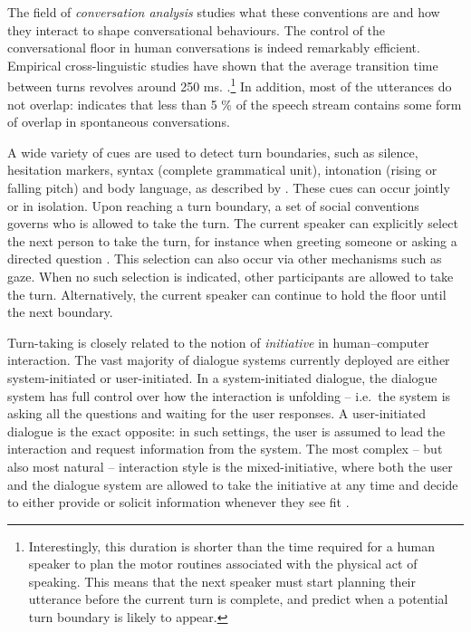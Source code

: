 The field of  \textit{conversation analysis} studies what these conventions are and how they interact to shape conversational behaviours. The control of the conversational floor in human conversations is indeed remarkably efficient.  Empirical cross-linguistic studies have shown that the average transition time between turns revolves around 250 ms. \citep{Stivers30062009}.\footnote{Interestingly, this duration is shorter than the time required for a human speaker to plan the motor routines associated with the physical act of speaking.  This means that the next speaker must start planning their utterance before the current turn is complete, and predict when a potential turn boundary is likely to appear.} In addition, most of the utterances do not overlap: \cite{Levinson1983} indicates that less than 5 \% of the speech stream contains some form of overlap in spontaneous conversations.  

A wide variety of cues are used to detect turn boundaries, such as silence, hesitation markers, syntax (complete grammatical unit), intonation (rising or falling pitch) and body language, as described by \cite{Duncan1972}.   These cues can occur jointly or in isolation. Upon reaching a turn boundary, a set of social conventions governs who is allowed to take the turn.  The current speaker can explicitly select the next person to take the turn, for instance when greeting someone or asking a directed question \citep{sacks1974}.   This selection can also occur via other mechanisms such as gaze.  When no such selection is indicated, other participants are allowed to take the turn.  Alternatively, the current speaker can continue to hold the floor until the next boundary. 

Turn-taking is closely related to the notion of \textit{initiative} in human--computer interaction. The vast majority of dialogue systems currently deployed are either system-initiated or user-initiated.  In a system-initiated dialogue, the dialogue system has full control over how the interaction is unfolding -- i.e.\ the system is asking all the questions and waiting for the user responses.  A user-initiated dialogue is the exact opposite: in such settings, the user is assumed to lead the interaction and request information from the system.  The most complex -- but also most natural -- interaction style is the mixed-initiative, where both the user and the dialogue system are allowed to take the initiative at any time and decide to either provide or solicit information whenever they see fit \citep{Horvitz:1999}. 

